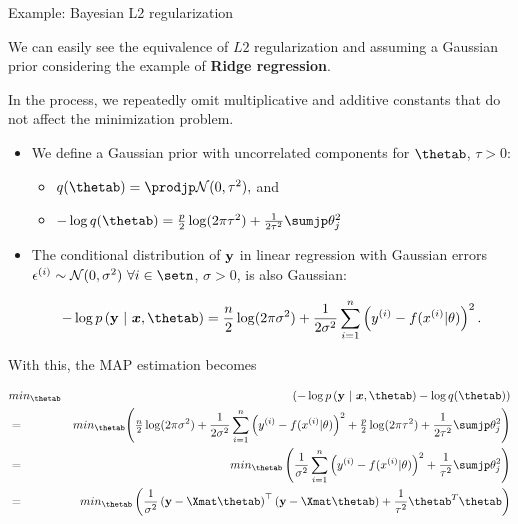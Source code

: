 \begin{vbframe}{Example: Bayesian L2 regularization}

\small

We can easily see the equivalence of $L2$ regularization and assuming a Gaussian
prior considering the example of \textbf{Ridge regression}.

\vfill

In the process, we repeatedly omit multiplicative and additive constants that 
do not affect the minimization problem.

\vfill

\begin{itemize}

  \small
  \item We define a Gaussian prior with uncorrelated components for $\thetab$, 
  $\tau > 0$:
  \begin{itemize}
    \footnotesize
    \item $q(\thetab) = \prodjp \mathcal{N}(0, \tau^2),$ and 
    \item $- \log q(\thetab) = \frac{p}{2} \log(2\pi \tau^2) + \frac{1}{2\tau^2} 
    \sumjp \theta_j^2$
  \end{itemize}
  
  \item The conditional distribution of $\mathbf{y}$ in linear regression with 
  Gaussian errors $\epsilon^{(i)} \sim \mathcal{N}(0, \sigma^2) ~ \forall i \in 
  \setn$, $\sigma > 0$, is also Gaussian: 
  \begin{footnotesize}
  $$- \log p\left(\ydat ~|~ \xv, \thetab\right) = \frac{n}{2} \log (2\pi 
  \sigma^2) + \frac{1}{2\sigma^2} \sumin \left(\yi - \fxit \right)^2.$$
  \end{footnotesize}
  
\end{itemize}

\framebreak

With this, the MAP estimation becomes

\begin{scriptsize}

\begin{eqnarray*}
&min_{\thetab}& \left(
- \log p\left(\ydat ~|~ \xv, \thetab\right) - \log q(\thetab)
\right) \\
&=& min_{\thetab} \Bigg(
\tfrac{n}{2} \log (2\pi \sigma^2) + \frac{1}{2\sigma^2} \sumin \left(\yi - 
\fxit \right)^2 + \tfrac{p}{2} \log(2\pi \tau^2) + 
\frac{1}{2\tau^2} \sumjp \theta_j^2
\Bigg) \\
&=& min_{\thetab} \left( \frac{1}{\sigma^2} \sumin \left(\yi -
\fxit \right)^2 + \frac{1}{\tau^2} \sumjp \theta_j^2 \right) \\
&=& min_{\thetab} \left(
\frac{1}{\sigma^2} \left(\ydat - \Xmat \thetab\right)^\top \left(\ydat - \Xmat
\thetab\right) + \frac{1}{\tau^2} {\thetab}^T\thetab
\right)
\end{eqnarray*}


\end{scriptsize}
\end{vbframe}
